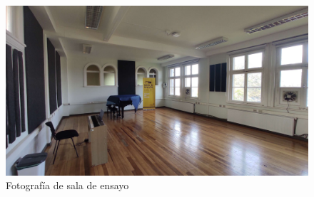 \begin{figure}[H]
    \centering
    \includegraphics[scale=0.1]{Imagenes/Antecedentes/Sala OCV.jpg}
    \caption{Fotografía de sala de ensayo}
    \label{fig: foto sala OCV}
\end{figure}

